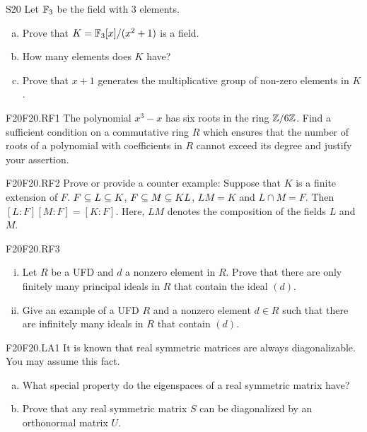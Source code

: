 \documentclass[../AlgebraQualSolutions.tex]{subfiles}
\begin{document}
	\begin{prob}{S20}{}
	Let $\mathbb{F}_3$ be the field with 3 elements.
	\begin{enumerate}[(a)]
	\item Prove that $K = \mathbb{F}_3[x]/(x^2 + 1)$ is a field.
	\item How many elements does $K$ have?
	\item Prove that $x+1$ generates the multiplicative group of non-zero elements in $K$.
	\end{enumerate}
	\end{prob}

	
	\begin{prob}{F20}{F20.RF1}
	The polynomial $x^3 - x$ has six roots in the ring $\mathbb{Z}/6\mathbb{Z}$. Find a sufficient condition on a commutative ring $R$ which ensures that the number of roots of a polynomial with coefficients in $R$ cannot exceed its degree and justify your assertion.
	\end{prob}
	
	\begin{prob}{F20}{F20.RF2}
	Prove or provide a counter example: Suppose that $K$ is a finite extension of $F$. $F \subseteq L \subseteq K$, $F \subseteq M \subseteq KL$, $LM = K$ and $L \cap M = F$. Then $[L:F][M:F] = [K:F]$. Here, $LM$ denotes the composition of the fields $L$ and $M$.
	\end{prob}
	
	\begin{prob}{F20}{F20.RF3}
		\begin{enumerate}[(i)]
		\item Let $R$ be a UFD and $d$ a nonzero element in $R$. Prove that there are only finitely many principal ideals  in $R$ that contain the ideal $(d)$.
		\item Give an example of a UFD $R$ and a nonzero element $d \in R$ such that there are infinitely many ideals in $R$ that contain $(d)$.
		\end{enumerate}
	\end{prob}
	
	\begin{prob}{F20}{F20.LA1}
	It is known that real symmetric matrices are always diagonalizable. You may assume this fact.
	\begin{enumerate}[(a)]
	\item What special property do the eigenspaces of a real symmetric matrix have?
	\item Prove that any real symmetric matrix $S$ can be diagonalized by an orthonormal matrix $U$.
	\end{enumerate}
	\end{prob}
	
\end{document}
